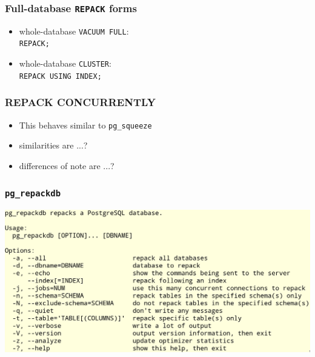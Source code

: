 \begin{frame}
  \frametitle{Full-database \texttt{REPACK} forms}
  \begin{itemize}
    \item whole-database \texttt{VACUUM FULL}: \\
      \texttt{REPACK;}
    \item whole-database \texttt{CLUSTER}: \\
      \texttt{REPACK USING INDEX;}
  \end{itemize}
\end{frame}

\begin{frame}
  \frametitle{REPACK CONCURRENTLY}

  \begin{itemize}
    \item This behaves similar to \texttt{pg\_squeeze}
    \item similarities are ...?
    \item differences of note are ...?
  \end{itemize}

%
%
%
%
\end{frame}

\begin{frame}
  \frametitle{\texttt{pg\_repackdb}}

    \includegraphics[height=\sizeforimages\textheight]{repackdb.png}
\end{frame}

